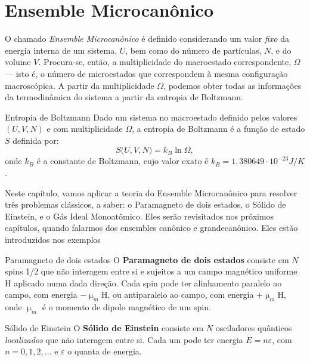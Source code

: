 \chapter{Ensemble Microcanônico}

    O chamado \textit{Ensemble Microcanônico} é definido considerando um valor \textit{fixo} da energia interna de um sistema, $U$, bem como do número de partículas, $N$, e do volume $V$. Procura-se, então, a multiplicidade do macroestado correspondente, $\Omega$ --- isto é, o número de microestados que correspondem à mesma configuração macroscópica. A partir da multiplicidade $\Omega$, podemos obter todas as informações da termodinâmica do sistema a partir da entropia de Boltzmann.

    \begin{statementbox}[label=def:entropia_de_boltzmann]{Entropia de Boltzmann}
        Dado um sistema no macroestado definido pelos valores $(U,V,N)$ e com multiplicidade $\Omega$, a entropia de Boltzmann é a função de estado $S$ definida por:
        \begin{equation}
            S(U,V,N\big)=k_B\ln\Omega,
        \end{equation}
        onde $k_B$ é a constante de Boltzmann, cujo valor exato é $k_B=1,380 649\cdot10^{-23}J/K$.
    \end{statementbox}

    Neste capítulo, vamos aplicar a teoria do Ensemble Microcanônico para resolver três problemas clássicos, a saber: o Paramagneto de dois estados, o Sólido de Einstein, e o Gás Ideal Monoatômico. Eles serão revisitados nos próximos capítulos, quando falarmos dos ensembles canônico e grandecanônico. Eles estão introduzidos nos exemplos 

     \begin{statementbox}{Paramagneto de dois estados}
        O \textbf{Paramagneto de dois estados} consiste em $N$ spins 1/2 que não interagem entre si e sujeitos a um campo magnético uniforme $\mathrm{H}$ aplicado numa dada direção. Cada spin pode ter alinhamento paralelo ao campo, com energia $-\upmu_m\mathrm{H}$, ou antiparalelo ao campo, com energia $+\upmu_m\mathrm{H}$, onde $\upmu_m$ é o momento de dipolo magnético de um spin.
    \end{statementbox}

    \begin{statementbox}{Sólido de Einstein}
        O \textbf{Sólido de Einstein} consiste em $N$ osciladores quânticos \textit{localizados} que não interagem entre si. Cada um pode ter energia $E=n\varepsilon$, com $n=0,1,2,\dots$ e $\varepsilon$ o quanta de energia.
    \end{statementbox}

